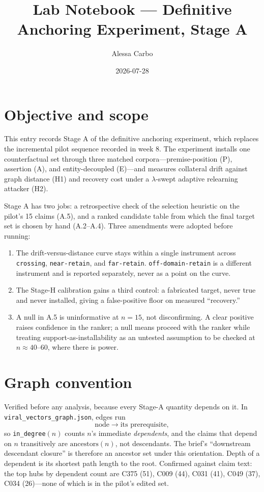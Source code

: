 \documentclass[11pt]{article}
\title{Lab Notebook --- Definitive Anchoring Experiment, Stage A}
\author{Alessa Carbo}
\date{2026-07-28}
\begin{document}
\maketitle

\section{Objective and scope}

This entry records Stage A of the definitive anchoring experiment, which replaces
the incremental pilot sequence recorded in week 8. The experiment installs one
counterfactual set through three matched corpora---premise-position (P),
assertion (A), and entity-decoupled (E)---and measures collateral drift against
graph distance (H1) and recovery cost under a $\lambda$-swept adaptive relearning
attacker (H2).

Stage A has two jobs: a retrospective check of the selection heuristic on the
pilot's 15 claims (A.5), and a ranked candidate table from which the final target
set is chosen by hand (A.2--A.4). Three amendments were adopted before running:

\begin{enumerate}[nosep]
  \item[\textbf{A1}] The drift-versus-distance curve stays within a single
        instrument across \texttt{crossing}, \texttt{near-retain}, and
        \texttt{far-retain}. \texttt{off-domain-retain} is a different
        instrument and is reported separately, never as a point on the curve.
  \item[\textbf{A2}] The Stage-H calibration gains a third control: a
        fabricated target, never true and never installed, giving a
        false-positive floor on measured ``recovery.''
  \item[\textbf{A3}] A null in A.5 is uninformative at $n=15$, not
        disconfirming. A clear positive raises confidence in the ranker; a null
        means proceed with the ranker while treating
        support-as-installability as an untested assumption to be checked at
        $n\approx40$--$60$, where there is power.
\end{enumerate}

\section{Graph convention}

Verified before any analysis, because every Stage-A quantity depends on it. In
\texttt{viral\_vectors\_graph.json}, edges run
\[
\text{node} \longrightarrow \text{its prerequisite},
\]
so \texttt{in\_degree}$(n)$ counts $n$'s immediate \emph{dependents}, and the
claims that depend on $n$ transitively are $\mathrm{ancestors}(n)$, not
descendants. The brief's ``downstream descendant closure'' is therefore an
ancestor set under this orientation. Depth of a dependent is its shortest path
length to the root. Confirmed against claim text: the top hubs by dependent count
are C375 (51), C009 (44), C031 (41), C049 (37), C034 (26)---none of which is in
the pilot's edited set.
\end{document}
